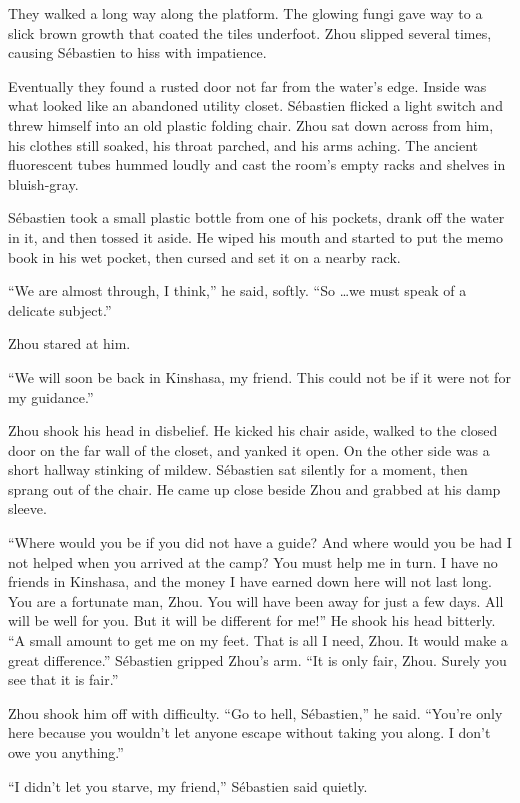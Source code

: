 \documentclass[10pt,a4paper]{article}
\begin{document}
They walked a long way along the platform. The glowing fungi gave
way to a slick brown growth that coated the tiles underfoot. Zhou
slipped several times, causing S\'{e}bastien to hiss with impatience.

Eventually they found a rusted door not far from the water's
edge. Inside was what looked like an abandoned utility
closet. S\'{e}bastien flicked a light switch and threw himself into
an old plastic folding chair. Zhou sat down across from him, his
clothes still soaked, his throat parched, and his arms aching.
The ancient fluorescent tubes hummed loudly and cast the room's
empty racks and shelves in bluish-gray.

S\'{e}bastien took a small plastic bottle from one of his pockets,
drank off the water in it, and then tossed it aside. He wiped his
mouth and started to put the memo book in his wet pocket, then
cursed and set it on a nearby rack.

``We are almost through, I think,'' he said, softly. ``So \ldots we must
speak of a delicate subject.''

Zhou stared at him.

``We will soon be back in Kinshasa, my friend. This could not be if
it were not for my guidance.''

Zhou shook his head in disbelief. He kicked his chair aside, walked
to the closed door on the far wall of the closet, and yanked it
open. On the other side was a short hallway stinking of mildew.
S\'{e}bastien sat silently for a moment, then sprang out of the chair.
He came up close beside Zhou and grabbed at his damp sleeve.

``Where would you be if you did not have a guide? And where would
you be had I not helped when you arrived at the camp? You must help
me in turn. I have no friends in Kinshasa, and the money I have
earned down here will not last long. You are a fortunate man, Zhou.
You will have been away for just a few days. All will be well for
you. But it will be different for me!'' He shook his head bitterly. ``A
small amount to get me on my feet. That is all I need, Zhou. It
would make a great difference.'' S\'{e}bastien gripped Zhou's arm.
``It is only fair, Zhou. Surely you see that it is fair.''

Zhou shook him off with difficulty. ``Go to hell, S\'{e}bastien,'' he said.
``You're only here because you wouldn't let anyone escape without
taking you along. I don't owe you anything.''

``I didn't let you starve, my friend,'' S\'{e}bastien said quietly.
\end{document}
